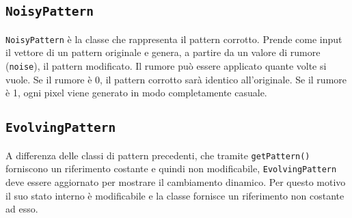 \documentclass{article}
\begin{document}
\subsection{\texttt{NoisyPattern}}
\texttt{NoisyPattern} è la classe che rappresenta il pattern corrotto. Prende come input il vettore di un pattern originale e genera, a partire da un valore di rumore (\texttt{noise}), il pattern modificato. Il rumore può essere applicato quante volte si vuole. Se il rumore è 0, il pattern corrotto sarà identico all'originale. Se il rumore è 1, ogni pixel viene generato in modo completamente casuale.
\subsection{\texttt{EvolvingPattern}}
A differenza delle classi di pattern precedenti, che tramite \texttt{getPattern()} forniscono un riferimento costante e quindi non modificabile, \texttt{EvolvingPattern} deve essere aggiornato per mostrare il cambiamento dinamico. Per questo motivo il suo stato interno è modificabile e la classe fornisce un riferimento non costante ad esso.
\end{document}
